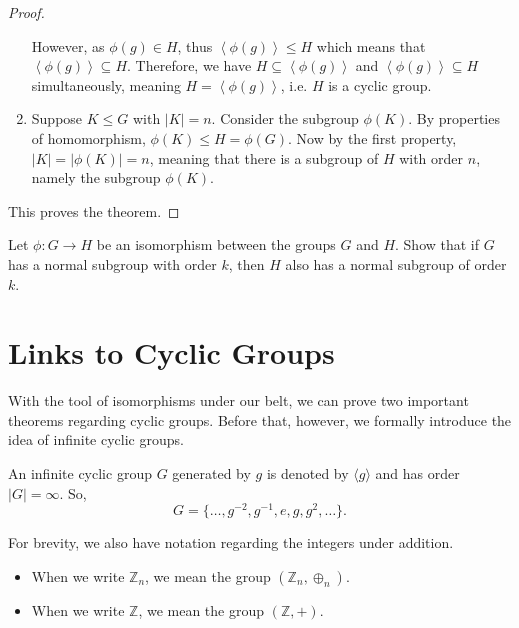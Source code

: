 \begin{proof}
\begin{enumerate}
        However, as $\phi(g) \in H$, thus $\left\langle \phi(g) \right\rangle \leq H$ which means that $\left\langle \phi(g) \right\rangle \subseteq H$. Therefore, we have $H \subseteq \left\langle \phi(g) \right\rangle$ and $\left\langle \phi(g) \right\rangle \subseteq H$ simultaneously, meaning $H = \left\langle \phi(g) \right\rangle$, i.e. $H$ is a cyclic group.

        \item Suppose $K \leq G$ with $|K| = n$. Consider the subgroup $\phi(K)$. By properties of homomorphism, $\phi(K) \leq H = \phi(G)$. Now by the first property, $|K| = |\phi(K)| = n$, meaning that there is a subgroup of $H$ with order $n$, namely the subgroup $\phi(K)$.
    \end{enumerate}

    This proves the theorem.
\end{proof}

\begin{exercise}
    Let $\phi: G \to H$ be an isomorphism between the groups $G$ and $H$. Show that if $G$ has a normal subgroup with order $k$, then $H$ also has a normal subgroup of order $k$.
\end{exercise}

\newpage

\section{Links to Cyclic Groups}
With the tool of isomorphisms under our belt, we can prove two important theorems regarding cyclic groups. Before that, however, we formally introduce the idea of infinite cyclic groups.
\begin{definition}
    An infinite cyclic group $G$ generated by $g$ is denoted by $\langle g \rangle$ and has order $|G| = \infty$. So,
    \[
        G = \{\dots, g^{-2}, g^{-1}, e, g, g^2, \dots\}.
    \]
\end{definition}

For brevity, we also have notation regarding the integers under addition.
\begin{itemize}
    \item When we write $\mathbb{Z}_n$, we mean the group $(\mathbb{Z}_n, \oplus_n)$.
    \item When we write $\mathbb{Z}$, we mean the group $(\mathbb{Z}, +)$.
\end{itemize}

